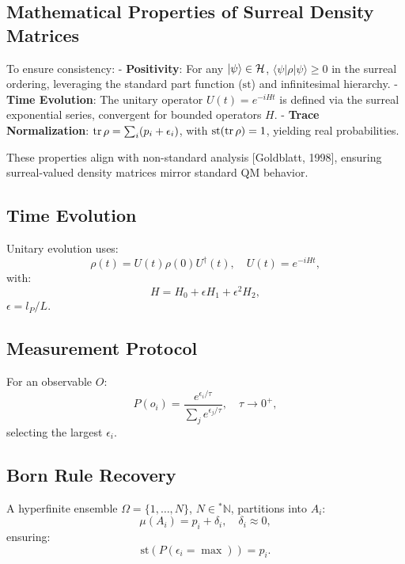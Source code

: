 \documentclass{article}
\begin{document}
\subsection{Mathematical Properties of Surreal Density Matrices}
To ensure consistency:
- \textbf{Positivity}: For any \(\ket{\psi} \in \mathcal{H}\), \(\langle \psi | \rho | \psi \rangle \geq 0\) in the surreal ordering, leveraging the standard part function (\(\text{st}\)) and infinitesimal hierarchy.
- \textbf{Time Evolution}: The unitary operator \(U(t) = e^{-i H t}\) is defined via the surreal exponential series, convergent for bounded operators \(H\).
- \textbf{Trace Normalization}: \(\tr \rho = \sum_i (p_i + \epsilon_i)\), with \(\text{st}(\tr \rho) = 1\), yielding real probabilities.

These properties align with non-standard analysis [Goldblatt, 1998], ensuring surreal-valued density matrices mirror standard QM behavior.

\subsection{Time Evolution}
Unitary evolution uses:
\begin{equation}
\rho(t) = U(t) \rho(0) U^\dagger(t), \quad U(t) = e^{-i H t},
\end{equation}
with:
\begin{equation}
H = H_0 + \epsilon H_1 + \epsilon^2 H_2,
\end{equation}
\(\epsilon = l_P / L\).

\subsection{Measurement Protocol}
For an observable \(O\):
\begin{equation}
P(o_i) = \frac{e^{\epsilon_i / \tau}}{\sum_j e^{\epsilon_j / \tau}}, \quad \tau \to 0^+,
\end{equation}
selecting the largest \(\epsilon_i\).

\subsection{Born Rule Recovery}
A hyperfinite ensemble \(\Omega = \{1, \dots, N\}\), \(N \in {}^*\mathbb{N}\), partitions into \(A_i\):
\begin{equation}
\mu(A_i) = p_i + \delta_i, \quad \delta_i \approx 0,
\end{equation}
ensuring:
\begin{equation}
\text{st}(P(\epsilon_i = \max)) = p_i.
\end{equation}
\end{document}
